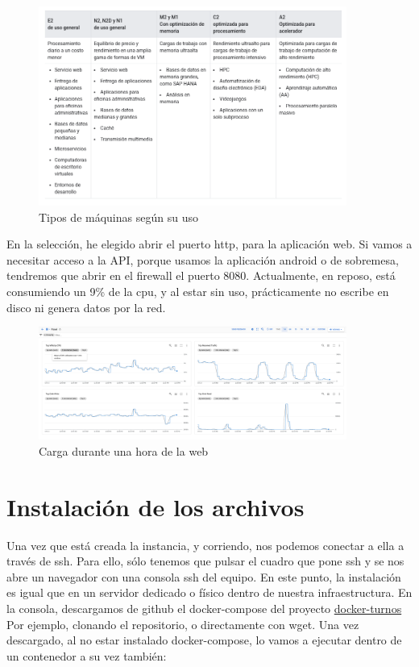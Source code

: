 \documentclass[11pt,spanish,listoffigures,listoftables]{tfgetsinf}
\begin{document}
\begin{figure}[h!] %
  \centering
   \includegraphics[width=0.90\textwidth]{img/cargas de trabajo.png}
   \caption{Tipos de máquinas según su uso}
   \label{fig:cargas}
 \end{figure}

 En la selección, he elegido abrir el puerto http, para la aplicación web. Si vamos a necesitar acceso a la API, porque usamos la aplicación android o de sobremesa, tendremos que abrir en el firewall el puerto 8080.
 Actualmente, en reposo, está consumiendo un 9\% de la cpu, y al estar sin uso, prácticamente no escribe en disco ni genera datos por la red.

 \begin{figure}[h!] %
  \centering
   \includegraphics[width=0.90\textwidth]{img/cargaGoogleCloud.png}
   \caption{Carga durante una hora de la web}
   \label{fig:cargaweb}
 \end{figure}

\section{Instalación de los archivos}

Una vez que está creada la instancia, y corriendo, nos podemos conectar a ella a través de ssh. Para ello, sólo tenemos que pulsar el cuadro que pone ssh y se nos abre un navegador con una consola ssh del equipo.
En este punto, la instalación es igual que en un servidor dedicado o físico dentro de nuestra infraestructura. En la consola, descargamos de github el docker-compose del proyecto \href{https://github.com/jrinconm/docker-turnos/}{docker-turnos}
Por ejemplo, clonando el repositorio, o directamente con wget. Una vez descargado, al no estar instalado docker-compose, lo vamos a ejecutar dentro de un contenedor a su vez también:
\end{document}
